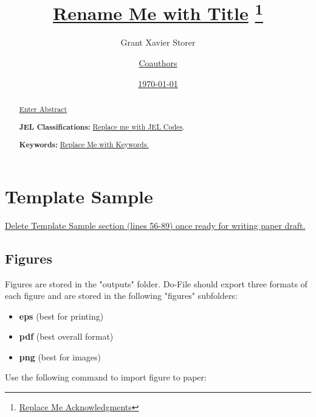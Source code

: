 \documentclass[12pt]{article}
\title
{
	\underline{Rename Me with Title}
	\thanks
	{
		\noindent \underline{Replace Me Acknowledgments}
	}
}%
\author
{
	Grant Xavier Storer 
	\and 
	\underline{Coauthors}
}%
\date
{
	\underline{\today}
}%
\begin{document}
\maketitle%


\begin{abstract}
\underline{Enter Abstract}

\bigskip

\noindent 	\textbf{JEL Classifications:} 
			\underline{Replace me with JEL Codes}.

\noindent 	\textbf{Keywords:} 
			\underline{ Replace Me with Keywords.}
\end{abstract}

\bigskip \pagebreak


\section{Template Sample}

\underline
{
	Delete Template Sample section (lines 56-89) 
	once ready for writing paper draft.
}

\subsection{Figures}

Figures are stored in the "outputs" folder. 
Do-File should export three formats of each figure and 
are stored in the following "figures" subfolders:

\begin{itemize}
	\item \textbf{eps} (best for printing)
	\item \textbf{pdf} (best overall format)
	\item \textbf{png} (best for images)
\end{itemize}

Use the following command to import figure to paper: 
\end{document}
